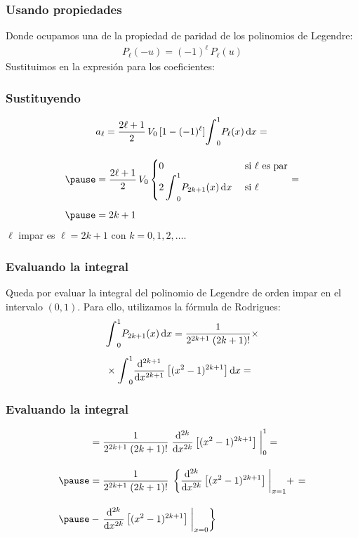 \documentclass[12pt]{beamer}
\begin{document}
\begin{frame}
\frametitle{Usando propiedades}
Donde ocupamos una de la propiedad de paridad de los polinomios de Legendre:
\pause
\begin{align*}
P_{\ell} (-u) = (-1)^{\ell} \, P_{\ell} (u)
\end{align*}
\pause
Sustituimos en la expresión para los coeficientes:
\end{frame}
\begin{frame}
\frametitle{Sustituyendo}
\begin{eqnarray*}
\begin{aligned}
&a_{\ell} = \dfrac{2 \ell + 1}{2} \, V_{0} \,  [1 - (-1)^{\ell} ] \scaleint{6ex}_{0}^{1} P_{\ell} (x) \dd{x} = \\[1em] \pause
&= \dfrac{2 \ell + 1}{2} \, V_{0} \begin{cases}
0 & \text{ si } \ell \text{ es par} \\
\displaystyle 2  \, \scaleint{6ex}_{0}^{1} P_{2 k + 1} (x) \dd{x} & \text{ si } \ell 
\end{cases} = \\[0.5em] \pause
&= 2 k + 1 
\end{aligned}
\end{eqnarray*}
\pause
$\ell$ impar es $\ell = 2 k + 1$ con $k = 0, 1, 2, \ldots$.
\end{frame}
\begin{frame}
\frametitle{Evaluando la integral}
Queda por evaluar la integral del polinomio de Legendre de orden impar en el intervalo $(0, 1)$. \pause Para ello, utilizamos la fórmula de Rodrigues:
\pause
\begin{align*}
&\scaleint{6ex}_{0}^{1} P_{2k+1} (x) \dd{x} = \dfrac{1}{2^{2k+1} \; (2k +1)!} \times \\[0.5em]
&\times \scaleint{6ex}_{0}^{1} \dv[2k+1]{x} \left[ (x^{2} - 1)^{2k+1} \right] \dd{x} = 
\end{align*}
\end{frame}
\begin{frame}
\frametitle{Evaluando la integral}
\begin{eqnarray*}
\begin{aligned}
&= \dfrac{1}{2^{2k+1} \; (2k +1)!} \; \dv[2k]{x} \left[ (x^{2} - 1)^{2k+1} \right] \eval_{0}^{1} = \\[1em] \pause
&= \dfrac{1}{2^{2k+1} \; (2k +1)!} \; \left\{ \dv[2k]{x} \left[ (x^{2} - 1)^{2k+1} \right] \eval_{x=1} + \right. = \\[1em] \pause
&- \left. \dv[2k]{x} \left[ (x^{2} - 1)^{2k+1} \right] \eval_{x=0} \right\}
\end{aligned}
\end{eqnarray*}
\end{frame}
\end{document}
